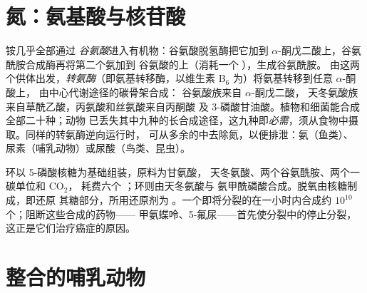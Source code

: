 \section{氮：氨基酸与核苷酸}

\begin{definition}[氮同化与转氨基作用]\label{def:b1:biosyntheses-integration:nitrogen}
铵几乎全部通过
\emph{谷氨酸}进入有机物：谷氨酸脱氢酶把它加到
$\alpha$-酮戊二酸上，谷氨酰胺合成酶再将第二个氨加到
谷氨酸的上（消耗一个 ），生成谷氨酰胺。
由这两个供体出发，\emph{转氨酶}（即氨基转移酶，以维生素
B$_6$ 为）将氨基转移到任意 $\alpha$-酮酸上，
由中心代谢途径的碳骨架合成：
谷氨酸族来自 $\alpha$-酮戊二酸，
天冬氨酸族来自草酰乙酸，丙氨酸和丝氨酸来自丙酮酸
及 3-磷酸甘油酸。植物和细菌能合成全部二十种；动物
已丢失其中九种的长合成途径，这九种即\emph{必需}，须从食物中摄取。同样的转氨酶逆向运行时，
可从多余的中去除氮，以便排泄：氨（鱼类）、
尿素（哺乳动物）或尿酸（鸟类、昆虫）。
\end{definition}

\begin{example}[核苷酸]\label{ex:b1:biosyntheses-integration:nucleotides}
环以 5-磷酸核糖为基础组装，原料为甘氨酸，
天冬氨酸、两个谷氨酰胺、两个一碳单位和 $\mathrm{CO_2}$，
耗费六个 ；环则由天冬氨酸与
氨甲酰磷酸合成。脱氧由核糖制成，即还原
其糖部分，所用还原剂为 。一个即将分裂的在一小时内合成约 $10^{10}$
个；阻断这些合成的药物——
甲氨蝶呤、5-氟尿——首先使分裂中的停止分裂，
这正是它们治疗癌症的原因。
\end{example}

\section{整合的哺乳动物}

